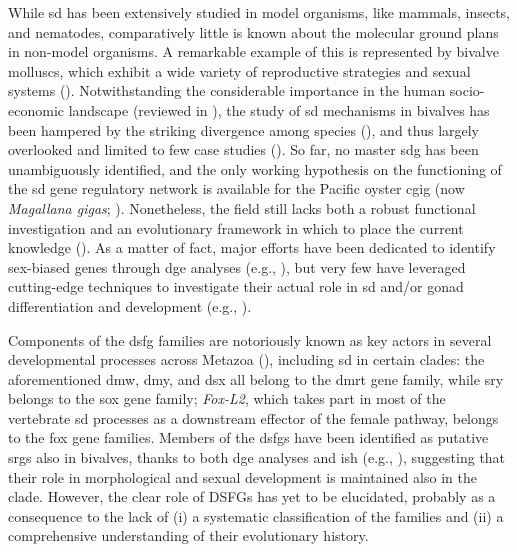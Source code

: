 While \gls{sd} has been extensively studied in model organisms, like mammals, insects, and nematodes, comparatively little is known about the molecular ground plans in non-model organisms. A remarkable example of this is represented by bivalve molluscs, which exhibit a wide variety of reproductive strategies and sexual systems (). Notwithstanding the considerable importance in the human socio-economic landscape (reviewed in ), the study of \gls{sd} mechanisms in bivalves has been hampered by the striking divergence among species (), and thus largely overlooked and limited to few case studies (). So far, no master \gls{sdg} has been unambiguously identified, and the only working hypothesis on the functioning of the \gls{sd} gene regulatory network is available for the Pacific oyster \gls{cgig} (now \textit{Magallana gigas}; ). Nonetheless, the field still lacks both a robust functional investigation and an evolutionary framework in which to place the current knowledge (). As a matter of fact, major efforts have been dedicated to identify sex-biased genes through \gls{dge} analyses (e.g., ), but very few have leveraged cutting-edge techniques to investigate their actual role in \gls{sd} and/or gonad differentiation and development (e.g., ).

Components of the \gls{dsfg} families are notoriously known as key actors in several developmental processes across Metazoa (), including \gls{sd} in certain clades: the aforementioned \gls{dmw}, \gls{dmy}, and \gls{dsx} all belong to the \gls{dmrt} gene family, while \gls{sry} belongs to the \gls{sox} gene family; \textit{Fox-L2}, which takes part in most of the vertebrate \gls{sd} processes as a downstream effector of the female pathway, belongs to the \gls{fox} gene families. Members of the \glspl{dsfg} have been identified as putative \glspl{srg} also in bivalves, thanks to both \gls{dge} analyses and \gls{ish} (e.g., ), suggesting that their role in morphological and sexual development is maintained also in the clade. However, the clear role of DSFGs has yet to be elucidated, probably as a consequence to the lack of (i) a systematic classification of the families and (ii) a comprehensive understanding of their evolutionary history.

